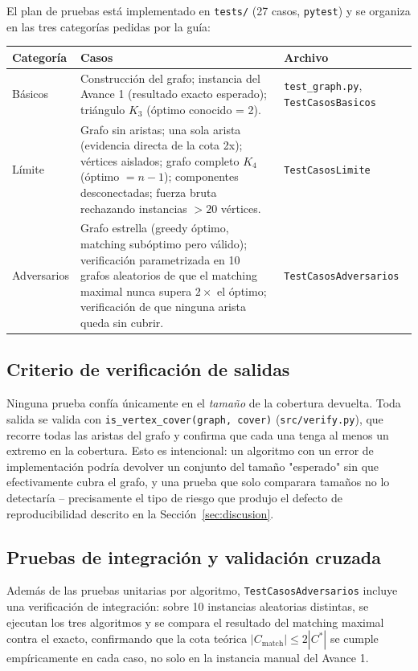 \documentclass[11pt,a4paper]{article}
\begin{document}
El plan de pruebas está implementado en \texttt{tests/} (27 casos, \texttt{pytest}) y se
organiza en las tres categorías pedidas por la guía:

\begin{center}
\small
\begin{tabular}{p{2.1cm}p{9.3cm}p{2.8cm}}
	\toprule
	\textbf{Categoría} & \textbf{Casos} & \textbf{Archivo} \\
	\midrule
	Básicos    & Construcción del grafo; instancia del Avance 1 (resultado exacto esperado);
	             triángulo $K_3$ (óptimo conocido = 2). & \texttt{test\_graph.py},
	             \texttt{TestCasos\-Basicos} \\[2pt]
	Límite     & Grafo sin aristas; una sola arista (evidencia directa de la cota 2x);
	             vértices aislados; grafo completo $K_4$ (óptimo $=n-1$); componentes
	             desconectadas; fuerza bruta rechazando instancias $>20$ vértices. &
	             \texttt{TestCasos\-Limite} \\[2pt]
	Adversarios & Grafo estrella (greedy óptimo, matching subóptimo pero válido);
	             verificación parametrizada en 10 grafos aleatorios de que el matching
	             maximal nunca supera $2\times$ el óptimo; verificación de que ninguna
	             arista queda sin cubrir. & \texttt{TestCasos\-Adversarios} \\
	\bottomrule
\end{tabular}
\end{center}
\normalsize

\subsection{Criterio de verificación de salidas}
Ninguna prueba confía únicamente en el \emph{tamaño} de la cobertura devuelta. Toda salida
se valida con \texttt{is\_vertex\_cover(graph, cover)} (\texttt{src/verify.py}), que
recorre todas las aristas del grafo y confirma que cada una tenga al menos un extremo en la
cobertura. Esto es intencional: un algoritmo con un error de implementación podría devolver
un conjunto del tamaño "esperado" sin que efectivamente cubra el grafo, y una prueba que
solo comparara tamaños no lo detectaría -- precisamente el tipo de riesgo que produjo el
defecto de reproducibilidad descrito en la Sección~\ref{sec:discusion}.

\subsection{Pruebas de integración y validación cruzada}
Además de las pruebas unitarias por algoritmo, \texttt{TestCasosAdversarios} incluye una
verificación de integración: sobre 10 instancias aleatorias distintas, se ejecutan los tres
algoritmos y se compara el resultado del matching maximal contra el exacto, confirmando que
la cota teórica $|C_{\text{match}}| \leq 2|C^{*}|$ se cumple empíricamente en cada caso, no
solo en la instancia manual del Avance 1.
\end{document}
